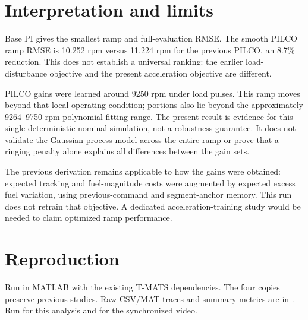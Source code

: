 \documentclass[11pt,a4paper]{article}
\begin{document}
\section{Interpretation and limits}
Base PI gives the smallest ramp and full-evaluation RMSE. The smooth PILCO ramp RMSE is 10.252 rpm versus 11.224 rpm for the previous PILCO, an 8.7\% reduction. This does not establish a universal ranking: the earlier load-disturbance objective and the present acceleration objective are different.

PILCO gains were learned around 9250 rpm under load pulses. This ramp moves beyond that local operating condition; portions also lie beyond the approximately 9264--9750 rpm polynomial fitting range. The present result is evidence for this single deterministic nominal simulation, not a robustness guarantee. It does not validate the Gaussian-process model across the entire ramp or prove that a ringing penalty alone explains all differences between the gain sets.

The previous derivation remains applicable to how the gains were obtained: expected tracking and fuel-magnitude costs were augmented by expected excess fuel variation, using previous-command and segment-anchor memory. This run does not retrain that objective. A dedicated acceleration-training study would be needed to claim optimized ramp performance.
\section{Reproduction}
Run  in MATLAB with the existing T-MATS dependencies. The four  copies preserve previous studies. Raw CSV/MAT traces and summary metrics are in . Run  for this analysis and  for the synchronized video.
\end{document}
